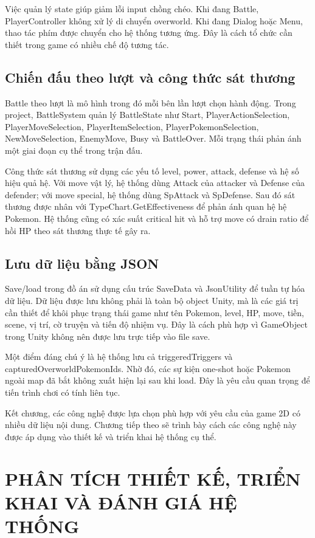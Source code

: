Việc quản lý state giúp giảm lỗi input chồng chéo. Khi đang Battle, PlayerController không xử lý di chuyển overworld. Khi đang Dialog hoặc Menu, thao tác phím được chuyển cho hệ thống tương ứng. Đây là cách tổ chức cần thiết trong game có nhiều chế độ tương tác.

\section{Chiến đấu theo lượt và công thức sát thương}

Battle theo lượt là mô hình trong đó mỗi bên lần lượt chọn hành động. Trong project, BattleSystem quản lý BattleState như Start, PlayerActionSelection, PlayerMoveSelection, PlayerItemSelection, PlayerPokemonSelection, NewMoveSelection, EnemyMove, Busy và BattleOver. Mỗi trạng thái phản ánh một giai đoạn cụ thể trong trận đấu.

Công thức sát thương sử dụng các yếu tố level, power, attack, defense và hệ số hiệu quả hệ. Với move vật lý, hệ thống dùng Attack của attacker và Defense của defender; với move special, hệ thống dùng SpAttack và SpDefense. Sau đó sát thương được nhân với TypeChart.GetEffectiveness để phản ánh quan hệ hệ Pokemon. Hệ thống cũng có xác suất critical hit và hỗ trợ move có drain ratio để hồi HP theo sát thương thực tế gây ra.

\section{Lưu dữ liệu bằng JSON}

Save/load trong đồ án sử dụng cấu trúc SaveData và JsonUtility để tuần tự hóa dữ liệu. Dữ liệu được lưu không phải là toàn bộ object Unity, mà là các giá trị cần thiết để khôi phục trạng thái game như tên Pokemon, level, HP, move, tiền, scene, vị trí, cờ truyện và tiến độ nhiệm vụ. Đây là cách phù hợp vì GameObject trong Unity không nên được lưu trực tiếp vào file save.

Một điểm đáng chú ý là hệ thống lưu cả triggeredTriggers và capturedOverworldPokemonIds. Nhờ đó, các sự kiện one-shot hoặc Pokemon ngoài map đã bắt không xuất hiện lại sau khi load. Đây là yêu cầu quan trọng để tiến trình chơi có tính liên tục.

Kết chương, các công nghệ được lựa chọn phù hợp với yêu cầu của game 2D có nhiều dữ liệu nội dung. Chương tiếp theo sẽ trình bày cách các công nghệ này được áp dụng vào thiết kế và triển khai hệ thống cụ thể.

\chapter{PHÂN TÍCH THIẾT KẾ, TRIỂN KHAI VÀ ĐÁNH GIÁ HỆ THỐNG}

